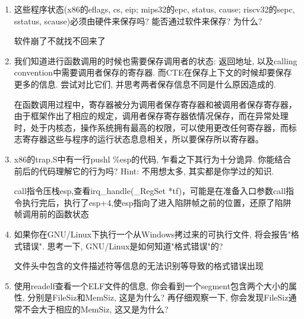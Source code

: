 \documentclass[UTF8,a4paper,10pt]{ctexart}
\begin{document}
{{\begin{enumerate}
        这个问题我只能抄网上,属于只可意会表达不出的概念。操作系统位于计算机硬件与应用软件之间，本质也是一个软件。操作系统由操作系统的内核（运行于内核态，管理硬件资源）以及系统调用（运行于用户态，为应用程序员写的应用程序提供系统调用接口）两部分组成。

        操作系统的功能是：进程管理，其主要任务是对处理器的时间进行合理分配、对处理器的运行实施有效的管理；存储器管理，主要任务是对存储器进行分配、保护和扩充；设备管理，根据确定的设备分配原则对设备进行分配，使设备与主机能够并行工作，为用户提供良好的设备使用界面；文件管理，有效地管理文件的存储空间，合理地组织和管理文件系统，为文件访问和文件保护提供更有效的方法及手段；用户接口，通过用户接口，用户只需进行简单操作，就能实现复杂的应用处理。
        
        如果放在NEMU上来看,操作系统就是运行在AM上的一个特殊的程序,他可以加载其他程序对他们进行资源分配和管理等等。
        \item 这些程序状态(x86的eflags, cs, eip; mips32的epc, status, cause; riscv32的sepc, sstatus, scause)必须由硬件来保存吗? 能否通过软件来保存? 为什么?
        
        软件崩了不就找不回来了
        \item 我们知道进行函数调用的时候也需要保存调用者的状态: 返回地址, 以及calling convention中需要调用者保存的寄存器. 而CTE在保存上下文的时候却要保存更多的信息. 尝试对比它们, 并思考两者保存信息不同是什么原因造成的.
        
        在函数调用过程中，寄存器被分为调用者保存寄存器和被调用者保存寄存器，由于框架作出了相应的规定，调用者保存寄存器依情况保存，而在异常处理时，处于内核态，操作系统拥有最高的权限，可以使用更改任何寄存器，而标志寄存器这些与程序的运行状态息息相关，所以要保存所以寄存器。
        \item x86的trap.S中有一行pushl \%esp的代码, 乍看之下其行为十分诡异. 你能结合前后的代码理解它的行为吗? Hint: 不用想太多, 其实都是你学过的知识.
        
        call指令压栈esp,查看irq\_handle(\_RegSet *tf)，可能是在准备入口参数call指令执行完后，执行了esp+4,使esp指向了进入陷阱帧之前的位置，还原了陷阱帧调用前的函数状态
        \item 如果你在GNU/Linux下执行一个从Windows拷过来的可执行文件, 将会报告"格式错误". 思考一下, GNU/Linux是如何知道"格式错误"的?
        
        文件头中包含的文件描述符等信息的无法识别等导致的格式错误出现
        \item 使用readelf查看一个ELF文件的信息, 你会看到一个segment包含两个大小的属性, 分别是FileSiz和MemSiz, 这是为什么? 再仔细观察一下, 你会发现FileSiz通常不会大于相应的MemSiz, 这又是为什么?
        

\end{enumerate}}}
\end{document}
